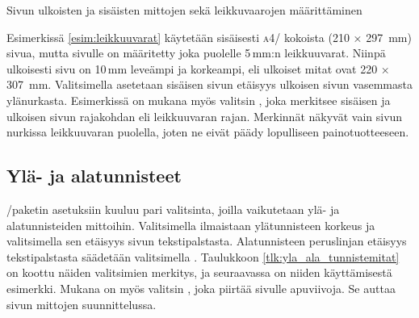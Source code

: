 \begin{esimerkki*}
\begin{koodilohko}
\end{koodilohko}
\caption{Sivun ulkoisten ja sisäisten mittojen sekä leikkuvaarojen
  määrittäminen}
\label{esim:leikkuuvarat}
\end{esimerkki*}

Esimerkissä \ref{esim:leikkuuvarat} käytetään sisäisesti \textsc{a4}\-/
kokoista (210 × 297~mm) sivua, mutta sivulle on määritetty joka puolelle
5\,mm:n leikkuuvarat. Niinpä ulkoisesti sivu on 10\,mm leveämpi ja
korkeampi, eli ulkoiset mitat ovat 220 × 307~mm. Valitsimella
 asetetaan sisäisen sivun etäisyys ulkoisen sivun
vasemmasta ylänurkasta. Esimerkissä on mukana myös valitsin
, joka merkitsee sisäisen ja ulkoisen sivun rajakohdan
eli leikkuuvaran rajan. Merkinnät näkyvät vain sivun nurkissa
leikkuuvaran puolella, joten ne eivät päädy lopulliseen
painotuotteeseen.

\subsection{Ylä- ja alatunnisteet}
\label{luku:yla_ala_tunnisteet}

\-/paketin asetuksiin kuuluu pari valitsinta, joilla
vaikutetaan ylä- ja alatunnisteiden mittoihin. Valitsimella 
ilmaistaan ylätunnisteen korkeus ja valitsimella  sen
etäisyys sivun tekstipalstasta. Alatunnisteen peruslinjan etäisyys
tekstipalstasta säädetään valitsimella . Taulukkoon
\ref{tlk:yla_ala_tunnistemitat} on koottu näiden valitsimien merkitys,
ja seuraavassa on niiden käyttämisestä esimerkki. Mukana on myös
valitsin , joka piirtää sivulle apuviivoja. Se auttaa
sivun mittojen suunnittelussa.

\begin{koodilohkosis}
  \geometry{head=24bp, headsep=8bp, footskip=12mm, showframe}
\end{koodilohkosis}


